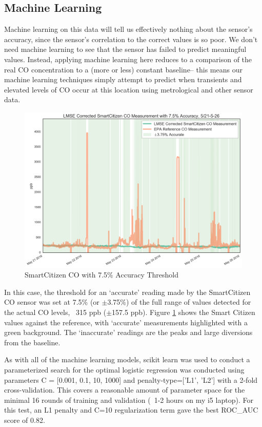 \FloatBarrier
\subsection{Machine Learning}


Machine learning on this data will tell us effectively nothing about the sensor's accuracy, since the sensor's correlation to the correct values is so poor.  We don't need machine learning to see that the sensor has failed to predict meaningful values.  Instead, applying machine learning here reduces to a comparison of the real CO concentration to a (more or less) constant baseline-- this means our machine learning techniques simply attempt to predict when transients and elevated levels of CO occur at this location using metrological and other sensor data. 


\begin{figure}[htb]
 	\includegraphics[width=\textwidth]{figs/sck_co_with_7p5_accuracy_zoomed}               
 	 \caption{SmartCitizen CO with 7.5\% Accuracy Threshold}
  	\label{fig:sck_co_with_7p5_accuracy_zoomed}
\end{figure}

In this case, the threshold for an `accurate' reading made by the SmartCitizen CO sensor was set at 7.5\% (or $\pm$3.75\%) of the full range of values detected for the actual CO levels, ~315 ppb ($\pm$157.5 ppb).   Figure \ref{fig:sck_co_with_7p5_accuracy_zoomed} shows the Smart Citizen values against the reference, with `accurate' measurements highlighted with a green background.  The `inaccurate' readings are the peaks and large diversions from the baseline.

As with all of the machine learning models, scikit learn was used to conduct a parameterized search for the optimal logistic regression was conducted using parameters C = [0.001, 0.1, 10, 1000] and penalty-type=['L1', 'L2'] with a 2-fold cross-validation.  This covers a reasonable amount of parameter space for the minimal 16 rounds of training and validation (~1-2 hours on my i5 laptop).  For this test, an L1 penalty and C=10 regularization term gave the best ROC\_AUC score of 0.82.  


